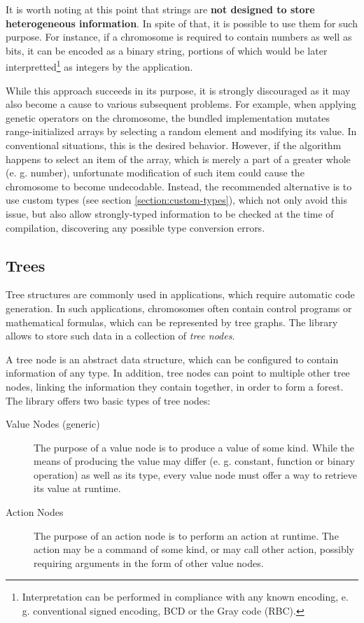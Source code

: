 It is worth noting at this point that strings are \textbf{not designed to store heterogeneous information}. In spite of that, it is possible to use them for such purpose. For instance, if a chromosome is required to contain numbers as well as bits, it can be encoded as a binary string, portions of which would be later interpretted\footnote{Interpretation can be performed in compliance with any known encoding, e. g. conventional signed encoding, BCD or the Gray code (RBC).} as integers by the application.

While this approach succeeds in its purpose, it is strongly discouraged as it may also become a cause to various subsequent problems. For example, when applying genetic operators on the chromosome, the bundled implementation mutates range-initialized arrays by selecting a random element and modifying its value. In conventional situations, this is the desired behavior. However, if the algorithm happens to select an item of the array, which is merely a part of a greater whole (e. g. number), unfortunate modification of such item could cause the chromosome to become undecodable. Instead, the recommended alternative is to use custom types (see section \ref{section:custom-types}), which not only avoid this issue, but also allow strongly-typed information to be checked at the time of compilation, discovering any possible type conversion errors.

\subsection{Trees}
Tree structures are commonly used in applications, which require automatic code generation. In such applications, chromosomes often contain control programs or mathematical formulas, which can be represented by tree graphs. The library allows to store such data in a collection of \textit{tree nodes}.

A tree node is an abstract data structure, which can be configured to contain information of any type. In addition, tree nodes can point to multiple other tree nodes, linking the information they contain together, in order to form a forest. The library offers two basic types of tree nodes:
~
\begin{description}
	\item[Value Nodes (generic)]
	The purpose of a value node is to produce a value of some kind. While the means of producing the value may differ (e. g. constant, function or binary operation) as well as its type, every value node must offer a way to retrieve its value at runtime.

	\item[Action Nodes]
	The purpose of an action node is to perform an action at runtime. The action may be a command of some kind, or may call other action, possibly requiring arguments in the form of other value nodes.
\end{description}

